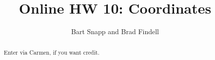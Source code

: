 \documentclass[handout,space,nooutcomes]{xourse}
\title{Online HW 10: Coordinates}
\author{Bart Snapp and Brad Findell}
\begin{document}
\begin{abstract}
Enter via Carmen, if you want credit.  
\end{abstract}
\maketitle

{}
\end{document}
